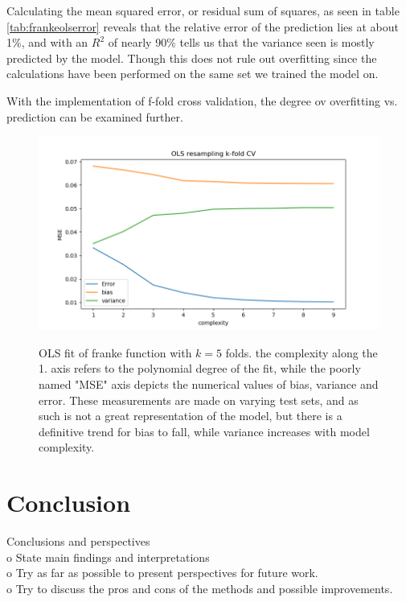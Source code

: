 \documentclass[ 12pt, a4paper ]{article}
\begin{document}
Calculating the mean squared error, or residual sum of squares, as seen in table 
\ref{tab:frankeolserror} reveals that the relative error of the prediction lies at about 1\%, 
and with an $R^2$ of nearly 90\% tells us that the variance seen is mostly predicted by the 
model. Though this does not rule out overfitting since the calculations have been performed on 
the same set we trained the model on. 


With the implementation of f-fold cross validation, the degree ov overfitting vs. prediction can
be examined further.

\begin{figure}
\includegraphics[scale=0.7]{frankeolsbiasvariance.png}
\label{fig:frankeolsbiasvariance}
\caption{
    OLS fit of franke function with $k=5$ folds. the complexity along the 1. axis refers
    to the polynomial degree of the fit, while the poorly named "MSE" axis depicts the 
    numerical values of bias, variance and error. These measurements are made on varying test
    sets, and as such is not a great representation of the model, but there is a definitive 
    trend for bias to fall, while variance increases with model complexity.
}
\end{figure}




\section{Conclusion}
    Conclusions and perspectives\\
    o   State main findings and interpretations \\
    o   Try as far as possible to present perspectives for future work. \\
    o   Try to discuss the pros and cons of the methods and possible improvements. \\
\end{document}
